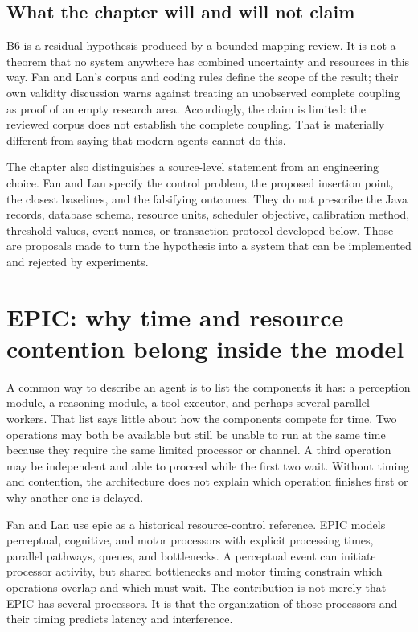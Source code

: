 \subsection{What the chapter will and will not claim}

B6 is a residual hypothesis produced by a bounded mapping review. It is not a theorem that no system anywhere has combined uncertainty and resources in this way. Fan and Lan's corpus and coding rules define the scope of the result; their own validity discussion warns against treating an unobserved complete coupling as proof of an empty research area. Accordingly, the claim is limited: the reviewed corpus does not establish the complete coupling. That is materially different from saying that modern agents cannot do this.

The chapter also distinguishes a source-level statement from an engineering choice. Fan and Lan specify the control problem, the proposed insertion point, the closest baselines, and the falsifying outcomes. They do not prescribe the Java records, database schema, resource units, scheduler objective, calibration method, threshold values, event names, or transaction protocol developed below. Those are proposals made to turn the hypothesis into a system that can be implemented and rejected by experiments.

\section{EPIC: why time and resource contention belong inside the model}
\label{sec:ch16-epic}

A common way to describe an agent is to list the components it has: a perception module, a reasoning module, a tool executor, and perhaps several parallel workers. That list says little about how the components compete for time. Two operations may both be available but still be unable to run at the same time because they require the same limited processor or channel. A third operation may be independent and able to proceed while the first two wait. Without timing and contention, the architecture does not explain which operation finishes first or why another one is delayed.

Fan and Lan use \gls{epic} as a historical resource-control reference. EPIC models perceptual, cognitive, and motor processors with explicit processing times, parallel pathways, queues, and bottlenecks. A perceptual event can initiate processor activity, but shared bottlenecks and motor timing constrain which operations overlap and which must wait. The contribution is not merely that EPIC has several processors. It is that the organization of those processors and their timing predicts latency and interference.\autocite{kieras1997epic}

